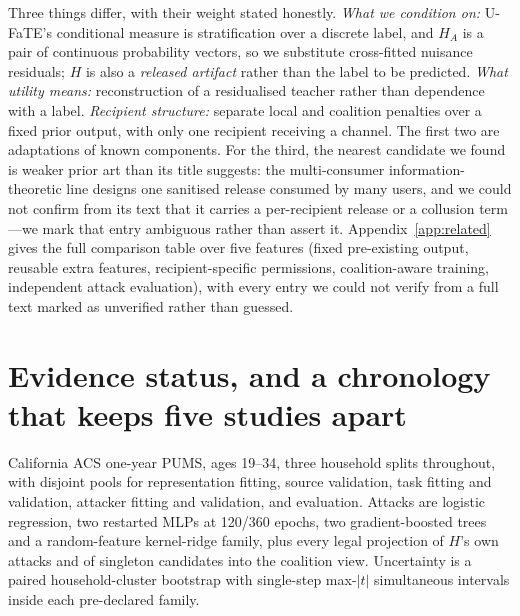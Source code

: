 \documentclass[10pt]{article}
\begin{document}
Three things differ, with their weight stated honestly. \emph{What we condition on:} U-FaTE's
conditional measure is stratification over a discrete label, and $H_A$ is a pair of continuous
probability vectors, so we substitute cross-fitted nuisance residuals; $H$ is also a \emph{released
artifact} rather than the label to be predicted. \emph{What utility means:} reconstruction of a
residualised teacher rather than dependence with a label. \emph{Recipient structure:} separate local
and coalition penalties over a fixed prior output, with only one recipient receiving a channel. The
first two are adaptations of known components. For the third, the nearest candidate we found is
weaker prior art than its title suggests: the multi-consumer information-theoretic line
\citep{sankar2013utility} designs one sanitised release consumed by many users, and we could not
confirm from its text that it carries a per-recipient release or a collusion term---we mark that
entry ambiguous rather than assert it. Appendix~\ref{app:related} gives the full comparison table over
five features (fixed pre-existing output, reusable extra features, recipient-specific permissions,
coalition-aware training, independent attack evaluation), with every entry we could not verify from a
full text marked as unverified rather than guessed.

\section{Evidence status, and a chronology that keeps five studies apart}
\label{sec:design}

California ACS one-year PUMS, ages 19--34, three household splits throughout, with disjoint pools for
representation fitting, source validation, task fitting and validation, attacker fitting and
validation, and evaluation. Attacks are logistic regression, two restarted MLPs at 120/360 epochs,
two gradient-boosted trees and a random-feature kernel-ridge family, plus every legal projection of
$H$'s own attacks and of singleton candidates into the coalition view. Uncertainty is a paired
household-cluster bootstrap with single-step max-$|t|$ simultaneous intervals inside each pre-declared
family.

\begin{table}[t]
\centering\footnotesize

\caption{Five studies, kept apart by what each is evidence \emph{for}. Only Study~1 is confirmatory.
Study~3 is a \emph{new formulation designed to repair a defect Study~2 diagnosed after evaluation};
it does not retroactively repair Study~2's evaluated maps, and its 2017 pass is development on a
partition Study~1 already spent, not a second sealed-year confirmation. Study~4 is complete and
integrated in \S\ref{sec:study4}. Study~5 has no outcome and no committed protocol.
\noteStudyChronologyFour}
\label{tab:chronology}
\end{table}
\end{document}
